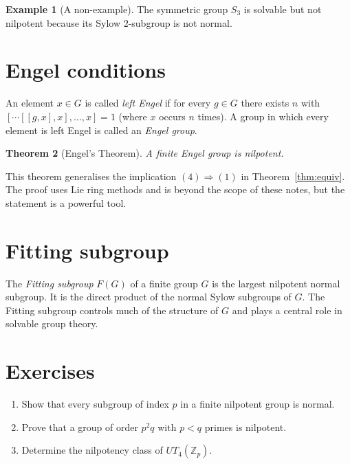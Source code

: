 \documentclass{article}
\newtheorem{theorem}{Theorem}[section]
\theoremstyle{definition}
\newtheorem{example}[theorem]{Example}
\begin{document}
\begin{example}[A non-example]
The symmetric group $S_3$ is solvable but not nilpotent because its Sylow $2$-subgroup is not normal.
\end{example}

\section{Engel conditions}

An element $x\in G$ is called \emph{left Engel} if for every $g\in G$ there exists $n$ with $[\cdots[[g,x],x],\ldots,x]=1$ (where $x$ occurs $n$ times).  A group in which every element is left Engel is called an \emph{Engel group}.

\begin{theorem}[Engel's Theorem]
A finite Engel group is nilpotent.
\end{theorem}

This theorem generalises the implication $(4)\Rightarrow(1)$ in Theorem~\ref{thm:equiv}.  The proof uses Lie ring methods and is beyond the scope of these notes, but the statement is a powerful tool.

\section{Fitting subgroup}

The \emph{Fitting subgroup} $F(G)$ of a finite group $G$ is the largest nilpotent normal subgroup.  It is the direct product of the normal Sylow subgroups of $G$.  The Fitting subgroup controls much of the structure of $G$ and plays a central role in solvable group theory.

\section{Exercises}

\begin{enumerate}
  \item Show that every subgroup of index $p$ in a finite nilpotent group is normal.
  \item Prove that a group of order $p^2q$ with $p<q$ primes is nilpotent.
  \item Determine the nilpotency class of $UT_4(\mathbb{Z}_p)$.
\end{enumerate}
\end{document}
